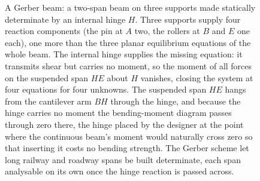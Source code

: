 \begin{figure}[htbp]
\caption[Gerber cantilever-hinged beam]{A Gerber beam: a two-span beam on three
supports made statically determinate by an internal hinge $H$. Three supports
supply four reaction components (the pin at $A$ two, the rollers at $B$ and $E$
one each), one more than the three planar equilibrium equations of the whole
beam. The internal hinge supplies the missing equation: it transmits shear but
carries no moment, so the moment of all forces on the suspended span $HE$ about
$H$ vanishes, closing the system at four equations for four unknowns. The
suspended span $HE$ hangs from the cantilever arm $BH$ through the hinge, and
because the hinge carries no moment the bending-moment diagram passes through
zero there, the hinge placed by the designer at the point where the continuous
beam's moment would naturally cross zero so that inserting it costs no bending
strength. The Gerber scheme let long railway and roadway spans be built
determinate, each span analysable on its own once the hinge reaction is passed
across.}
\label{fig:vol03ch02:gerber-beam}
\end{figure}
